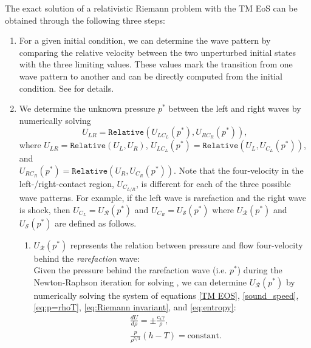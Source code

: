 The exact solution of a relativistic Riemann problem with the TM EoS can be obtained through the following three steps:
\begin{enumerate}
    \item For a given initial condition, we can determine the wave pattern by comparing the relative velocity between the two unperturbed initial states with the three limiting values. These values mark the transition from one wave pattern to another and can be directly computed from the initial condition. See \citet{REZZOLLA2001} for details.
    \item We determine the unknown pressure $p^{*}$ between the left and right waves by numerically solving
    \begin{equation}
    U_{LR}=\texttt{Relative}(U_{LC_{L}}(p^{*}), U_{RC_{R}}(p^{*})),
    \label{eq:p*}
    \end{equation}
    where $U_{LR}=\texttt{Relative}(U_{L}, U_{R})$, $U_{LC_{L}}(p^{*})=\texttt{Relative}(U_{L}, U_{C_{L}}(p^{*}))$, and\\ $U_{RC_{R}}(p^{*})=\texttt{Relative}(U_{R}, U_{C_{R}}(p^{*}))$. Note that the four-velocity in the left-/right-contact region, $U_{C_{L/R}}$, is different for each of the three possible wave patterns. For example, if the left wave is rarefaction and the right wave is shock, then $U_{C_{L}}=U_{\mathscr{R}}(p^*)$ and $U_{C_{R}}=U_{\mathscr{S}}(p^*)$ where $U_{\mathscr{R}}(p^*)$ and $U_{\mathscr{S}}(p^*)$ are defined as follows.
          \begin{enumerate}
          \item $U_{\mathscr{R}}(p^*)$ represents the relation between pressure and flow four-velocity behind the \emph{rarefaction} wave:\\
          Given the pressure behind the rarefaction wave (i.e. $p^{*}$) during the Newton-Raphson iteration for solving , we can determine $U_{\mathscr{R}}(p^*)$ by numerically solving the system of equations \eqref{TM EOS}, \eqref{sound_speed}, \eqref{eq:p=rhoT}, \eqref{eq:Riemann invariant}, and \eqref{eq:entropy}:
          \begin{subequations}
          \begin{align}
          &\frac{dU}{d\rho}=\pm \frac{c_{\text{s}}\gamma}{\rho},\label{eq:Riemann invariant}\\
          &\frac{p}{\rho^{5/3}}(h-T)=\text{constant}.\label{eq:entropy}
          \end{align}
          \label{eq: U behind r wave}
          \end{subequations}

\end{enumerate}
\end{enumerate}
